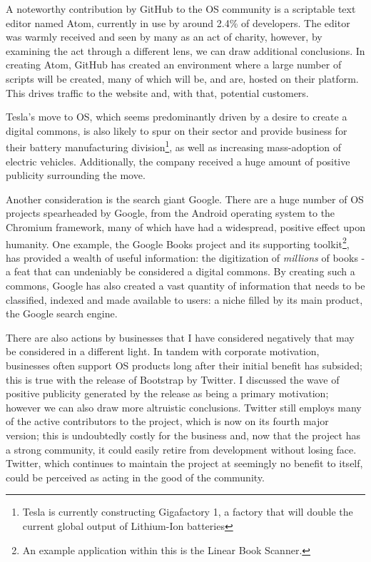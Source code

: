 \documentclass[a4paper]{article}
\begin{document}
A noteworthy contribution by GitHub to the OS community is a scriptable text editor named Atom, currently in use by around 2.4\% of developers\cite{editorusage}. The editor was warmly received \cite{atomrelease} and seen by many as an act of charity, however, by examining the act through a different lens, we can draw additional conclusions. In creating Atom, GitHub has created an environment where a large number of scripts will be created, many of which will be, and are, hosted on their platform. This drives traffic to the website and, with that, potential customers.

Tesla’s move to OS, which seems predominantly driven by a desire to create a digital commons, is also likely to spur on their sector and provide business for their battery manufacturing division\footnote{Tesla is currently constructing Gigafactory 1, a factory that will double the current global output of Lithium-Ion batteries\cite{gigafactory}}, as well as increasing mass-adoption of electric vehicles. Additionally, the company received a huge amount of positive publicity surrounding the move.

Another consideration is the search giant Google\cite{google}. There are a huge number of OS projects spearheaded by Google, from the Android operating system\cite{android} to the Chromium framework\cite{chromium}, many of which have had a widespread, positive effect upon humanity. One example, the Google Books project and its supporting toolkit\footnote{An example application within this is the Linear Book Scanner\cite{linearbookscanner}.}, has provided a wealth of useful information: the digitization of \textit{millions} of books - a feat that can undeniably be considered a digital commons. By creating such a commons, Google has also created a vast quantity of information that needs to be classified, indexed and made available to users: a niche filled by its main product, the Google search engine.

There are also actions by businesses that I have considered negatively that may be considered in a different light. In tandem with corporate motivation, businesses often support OS products long after their initial benefit has subsided; this is true with the release of Bootstrap by Twitter. I discussed the wave of positive publicity generated by the release as being a primary motivation; however we can also draw more altruistic conclusions. Twitter still employs many of the active contributors to the project\cite{bootstrapcontrib}, which is now on its fourth major version; this is undoubtedly costly for the business and, now that the project has a strong community, it could easily retire from development without losing face. Twitter, which continues to maintain the project at seemingly no benefit to itself, could be perceived as acting in the good of the community.
\end{document}
